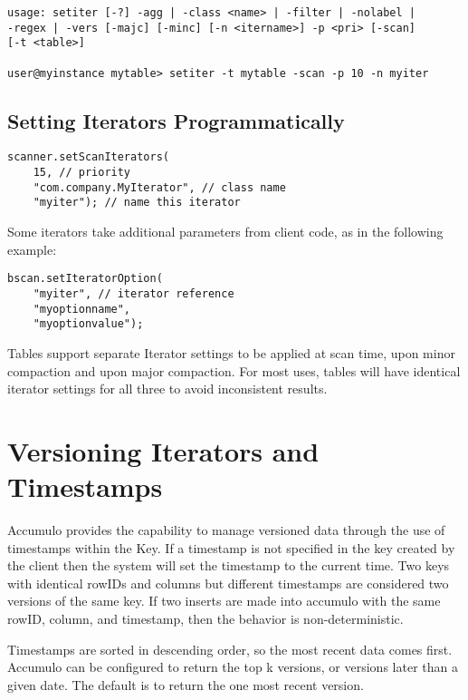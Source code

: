 \small
\begin{verbatim}
usage: setiter [-?] -agg | -class <name> | -filter | -nolabel | 
-regex | -vers [-majc] [-minc] [-n <itername>] -p <pri> [-scan] 
[-t <table>]

user@myinstance mytable> setiter -t mytable -scan -p 10 -n myiter
\end{verbatim}
\normalsize

\subsection{Setting Iterators Programmatically}

\small
\begin{verbatim}
scanner.setScanIterators(
    15, // priority
    "com.company.MyIterator", // class name
    "myiter"); // name this iterator
\end{verbatim}
\normalsize

Some iterators take additional parameters from client code, as in the following
example:

\small
\begin{verbatim}
bscan.setIteratorOption(
    "myiter", // iterator reference
    "myoptionname",
    "myoptionvalue");
\end{verbatim}
\normalsize

Tables support separate Iterator settings to be applied at scan time, upon minor
compaction and upon major compaction. For most uses, tables will have identical
iterator settings for all three to avoid inconsistent results.

\section{Versioning Iterators and Timestamps}

Accumulo provides the capability to manage versioned data through the use of
timestamps within the Key. If a timestamp is not specified in the key created by the
client then the system will set the timestamp to the current time. Two keys with
identical rowIDs and columns but different timestamps are considered two versions
of the same key. If two inserts are made into accumulo with the same rowID,
column, and timestamp, then the behavior is non-deterministic.

Timestamps are sorted in descending order, so the most recent data comes first.
Accumulo can be configured to return the top k versions, or versions later than a
given date. The default is to return the one most recent version.

